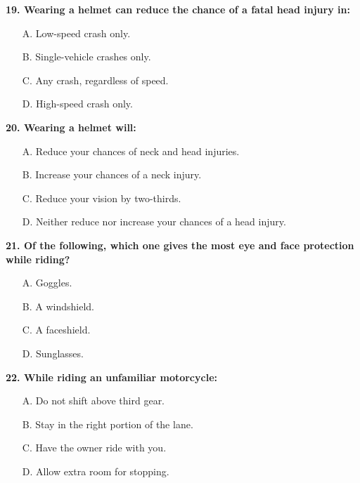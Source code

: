 \begin{minipage}{\linewidth}
\vspace{1em}\noindent\textbf{19. Wearing a helmet can reduce the chance of a fatal head injury in:}

\begin{itemize}[nosep,leftmargin=2em]
\item [A.] Low-speed crash only.
\item [B.] Single-vehicle crashes only.
\item [C.] Any crash, regardless of speed.
\item [D.] High-speed crash only.

\end{itemize}
\end{minipage}


\begin{minipage}{\linewidth}
\vspace{1em}\noindent\textbf{20. Wearing a helmet will:}

\begin{itemize}[nosep,leftmargin=2em]
\item [A.] Reduce your chances of neck and head injuries.
\item [B.] Increase your chances of a neck injury.
\item [C.] Reduce your vision by two-thirds.
\item [D.] Neither reduce nor increase your chances of a head injury.

\end{itemize}
\end{minipage}


\begin{minipage}{\linewidth}
\vspace{1em}\noindent\textbf{21. Of the following, which one gives the most eye and face protection while riding?}

\begin{itemize}[nosep,leftmargin=2em]
\item [A.] Goggles.
\item [B.] A windshield.
\item [C.] A faceshield.
\item [D.] Sunglasses.

\end{itemize}
\end{minipage}


\begin{minipage}{\linewidth}
\vspace{1em}\noindent\textbf{22. While riding an unfamiliar motorcycle:}

\begin{itemize}[nosep,leftmargin=2em]
\item [A.] Do not shift above third gear.
\item [B.] Stay in the right portion of the lane.
\item [C.] Have the owner ride with you.
\item [D.] Allow extra room for stopping.

\end{itemize}
\end{minipage}


